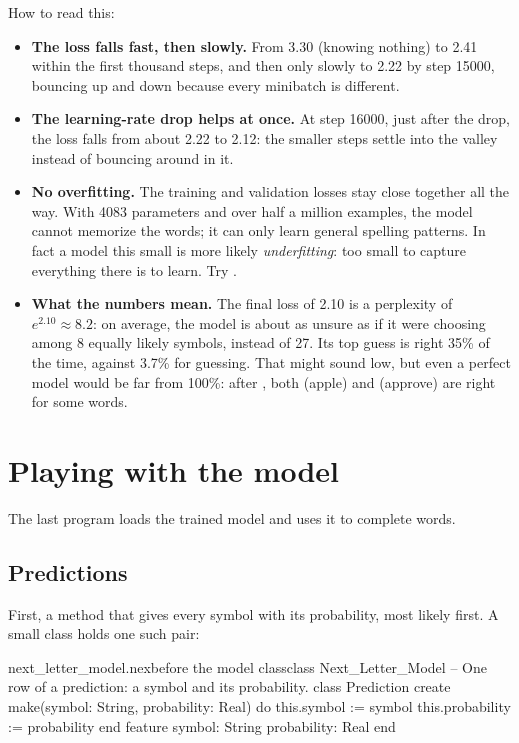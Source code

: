 \documentclass[11pt,a4paper,oneside,openany]{book}
\newcommand{\code}[1]{\texttt{\detokenize{#1}}}
\begin{document}
How to read this:
\begin{itemize}
  \item \textbf{The loss falls fast, then slowly.} From 3.30 (knowing
    nothing) to 2.41 within the first thousand steps, and then only slowly
    to 2.22 by step 15000, bouncing up and down because every minibatch is
    different.
  \item \textbf{The learning-rate drop helps at once.} At step 16000, just
    after the drop, the loss falls from about 2.22 to 2.12: the smaller
    steps settle into the valley instead of bouncing around in it.
  \item \textbf{No overfitting.} The training and validation losses stay
    close together all the way. With 4083 parameters and over half a
    million examples, the model cannot memorize the words; it can only
    learn general spelling patterns. In fact a model this small is more
    likely \emph{underfitting}: too small to capture everything there is
    to learn. Try \code{--hidden 128}.
  \item \textbf{What the numbers mean.} The final loss of 2.10 is a
    perplexity of $e^{2.10}\approx 8.2$: on average, the model is about as
    unsure as if it were choosing among 8 equally likely symbols, instead
    of 27. Its top guess is right 35\% of the time, against 3.7\% for
    guessing. That might sound low, but even a perfect model would be far
    from 100\%: after \code{app}, both \code{l} (apple) and \code{r}
    (approve) are right for some words.
\end{itemize}

\chapter{Playing with the model}

The last program loads the trained model and uses it to complete words.

\section{Predictions}

First, a method that gives every symbol with its probability, most likely
first. A small class holds one such pair:

\begin{addbefore}{next_letter_model.nex}{before the model class}{class Next_Letter_Model}
-- One row of a prediction: a symbol and its probability.
class Prediction
create
  make(symbol: String, probability: Real) do
    this.symbol := symbol
    this.probability := probability
  end
feature
  symbol: String
  probability: Real
end
\end{addbefore}
\end{document}
